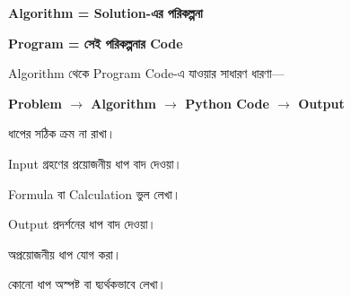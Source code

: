 \begin{center}

\textbf{
Algorithm = Solution-এর পরিকল্পনা
}

\vspace{0.5mm}

\textbf{
Program = সেই পরিকল্পনার Code
}

\end{center}

Algorithm থেকে Program Code-এ যাওয়ার সাধারণ ধারণা—

\begin{center}

\textbf{
Problem
\(\longrightarrow\)
Algorithm
\(\longrightarrow\)
Python Code
\(\longrightarrow\)
Output
}

\end{center}


\begin{compacttwocolpoints}

\item ধাপের সঠিক ক্রম না রাখা।

\item Input গ্রহণের প্রয়োজনীয় ধাপ বাদ দেওয়া।

\item Formula বা Calculation ভুল লেখা।

\item Output প্রদর্শনের ধাপ বাদ দেওয়া।

\item অপ্রয়োজনীয় ধাপ যোগ করা।

\item কোনো ধাপ অস্পষ্ট বা দ্ব্যর্থকভাবে লেখা।

\end{compacttwocolpoints}

